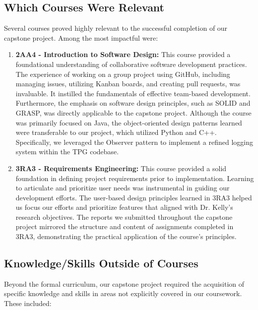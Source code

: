 \documentclass{article}
\begin{document}
\subsection{Which Courses Were Relevant}

Several courses proved highly relevant to the successful completion of our capstone project. Among the most impactful were:

\begin{enumerate}
    \item \textbf{2AA4 - Introduction to Software Design:} This course provided a foundational understanding of collaborative software development practices. The experience of working on a group project using GitHub, including managing issues, utilizing Kanban boards, and creating pull requests, was invaluable. It instilled the fundamentals of effective team-based development. Furthermore, the emphasis on software design principles, such as SOLID and GRASP, was directly applicable to the capstone project. Although the course was primarily focused on Java, the object-oriented design patterns learned were transferable to our project, which utilized Python and C++. Specifically, we leveraged the Observer pattern to implement a refined logging system within the TPG codebase.

    \item \textbf{3RA3 - Requirements Engineering:} This course provided a solid foundation in defining project requirements prior to implementation. Learning to articulate and prioritize user needs was instrumental in guiding our development efforts. The user-based design principles learned in 3RA3 helped us focus our efforts and prioritize features that aligned with Dr. Kelly's research objectives. The reports we submitted throughout the capstone project mirrored the structure and content of assignments completed in 3RA3, demonstrating the practical application of the course's principles.
\end{enumerate}

\subsection{Knowledge/Skills Outside of Courses}

Beyond the formal curriculum, our capstone project required the acquisition of specific knowledge and skills in areas not explicitly covered in our coursework. These included:
\end{document}
